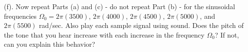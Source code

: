 (f). Now repeat Parts (a) and (c) - do not repeat Part (b) - for the sinusoidal frequencies $\Omega_0 = 2\pi(3500)$, $2\pi(4000)$, $2\pi(4500)$, $2\pi(5000)$, and $2\pi(5500)$ rad/sec. Also play each sample signal using sound. Does the pitch of the tone that you hear increase with each increase in the frequency $\Omega_0$? If not, can you explain this behavior?
